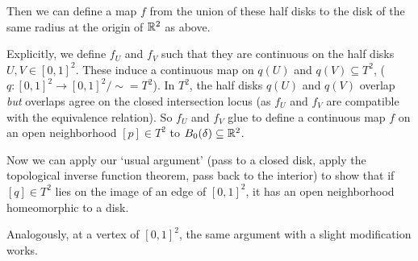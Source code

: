 \documentclass[a4paper]{scrartcl}
\begin{document}
\begin{example}
\begin{center}
        

    \end{center}

Then we can define a map $f$ from the union of these half disks to the disk of the same radius at the origin of $\mathbb{R}^2$ as above. 

Explicitly, we define $f_U$ and $f_V$ such that they are continuous on the half disks $U, V \in [0, 1]^2$. These induce a continuous map on $q(U)$ and $q(V) \subseteq T^2$, ($q: [0, 1]^2 \rightarrow [0, 1]^2/\sim = T^2$). In $T^2$, the half disks $q(U)$ and $q(V)$ overlap \emph{but} overlaps agree on the closed intersection locus (as $f_U$ and $f_V$ are compatible with the equivalence relation). So $f_U$ and $f_V$ glue to define a continuous map $f$ on an open neighborhood $[p] \in T^2$ to $B_0(\delta) \subseteq \mathbb{R}^2$.

Now we can apply our `usual argument' (pass to a closed disk, apply the topological inverse function theorem, pass back to the interior) to show that if $[q] \in T^2$ lies on the image of an edge of $[0, 1]^2$, it has an open neighborhood homeomorphic to a disk.

Analogously, at a vertex of $[0, 1]^2$, the same argument with a slight modification works.
\begin{center}
    


\begin{tikzpicture}[x=0.75pt,y=0.75pt,yscale=-1,xscale=1]


\end{tikzpicture}
\end{center}
\end{example}
\end{document}
